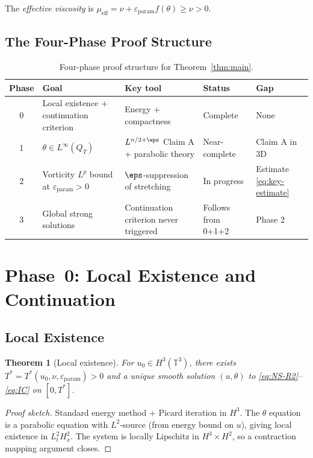 \documentclass[11pt]{article}
\newtheorem{theorem}{Theorem}[section]
\theoremstyle{definition}
\theoremstyle{remark}
\newcommand{\T}{\mathbb{T}}
\newcommand{\Hs}[1]{H^{#1}}
\newcommand{\mueff}{\mu_{\mathrm{eff}}}
\newcommand{\epsp}{\varepsilon_{\mathrm{param}}}
\begin{document}
The \emph{effective viscosity} is $\mueff = \nu + \epsp f(\theta)\geq\nu>0$.

\subsection{The Four-Phase Proof Structure}

\begin{table}[h]
\centering
\caption{Four-phase proof structure for Theorem~\ref{thm:main}.}
\begin{tabular}{@{}cllll@{}}
\toprule
Phase & Goal & Key tool & Status & Gap \\
\midrule
0 & Local existence + continuation criterion & Energy + compactness & Complete & None \\
1 & $\theta\in L^\infty(Q_T)$ & $L^{n/2+\eps}$ Claim A + parabolic theory & Near-complete & Claim A in 3D \\
2 & Vorticity $L^p$ bound at $\epsp>0$ & $\eps$-suppression of stretching & In progress & Estimate \eqref{eq:key-estimate} \\
3 & Global strong solutions & Continuation criterion never triggered & Follows from 0+1+2 & Phase 2 \\
\bottomrule
\end{tabular}
\end{table}

\section{Phase~0: Local Existence and Continuation}
\label{sec:phase0}

\subsection{Local Existence}

\begin{theorem}[Local existence]\label{thm:local}
  For $u_0\in\Hs{3}(\T^3)$, there exists $T^*=T^*(u_0,\nu,\epsp)>0$ and a
  unique smooth solution $(u,\theta)$ to \eqref{eq:NS-R2}--\eqref{eq:IC}
  on $[0,T^*]$.
\end{theorem}

\begin{proof}[Proof sketch]
  Standard energy method + Picard iteration in $\Hs{3}$.  The $\theta$
  equation is a parabolic equation with $L^2$-source (from energy bound on $u$),
  giving local existence in $L^2_t\Hs{2}_x$.  The system is locally
  Lipschitz in $\Hs{3}\times\Hs{2}$, so a contraction mapping argument closes.
\end{proof}
\end{document}
